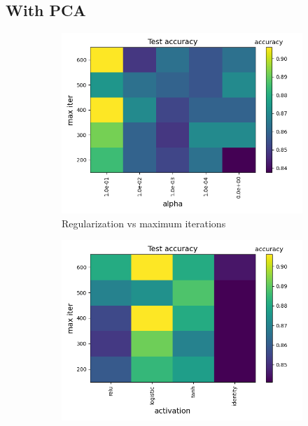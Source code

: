 \documentclass[a4paper]{article}
\begin{document}
\subsection{With PCA}

\begin{figure}[H]
  \centering
  \begin{subfigure}{0.49\textwidth}
    \includegraphics[scale=0.45]{../figures/neural_net/heatmaps/heatmap_nbins200_pca35_seed4155_ts0.20_accuracy_alpha_max_iter.png}
    \caption{Regularization vs maximum iterations}
  \end{subfigure}
  \begin{subfigure}{0.49\textwidth}
    \includegraphics[scale=0.45]{../figures/neural_net/heatmaps/heatmap_nbins200_pca35_seed4155_ts0.20_accuracy_activation_max_iter.png}

\end{subfigure}
\end{figure}
\end{document}
